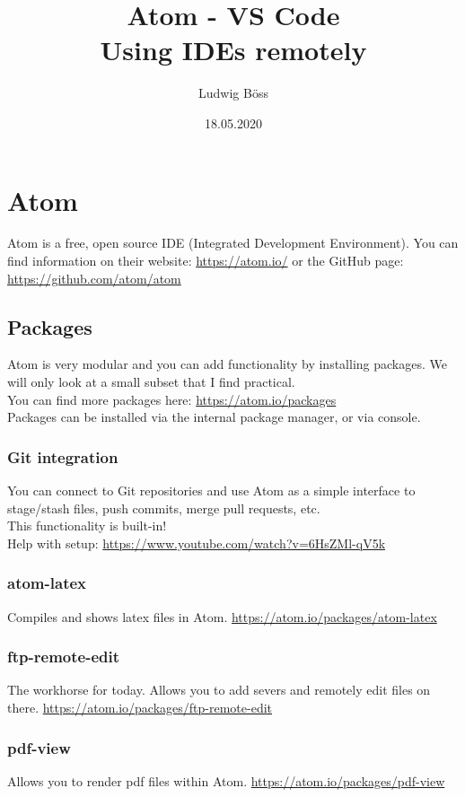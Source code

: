 \documentclass[10pt,a4paper]{article}
\title{Atom - VS Code\\Using IDEs remotely}
\date{18.05.2020}
\author{Ludwig Böss}
\begin{document}
\maketitle

\section{Atom}

Atom is a free, open source IDE (Integrated Development Environment). You can find information on their website: \url{https://atom.io/} or the GitHub page: \url{https://github.com/atom/atom}

\subsection{Packages}
Atom is very modular and you can add functionality by installing packages. We will only look at a small subset that I find practical.\\
You can find more packages here: \url{https://atom.io/packages}\\
Packages can be installed via the internal package manager, or via console.\\

\subsubsection{Git integration}
You can connect to Git repositories and use Atom as a simple interface to stage/stash files, push commits, merge pull requests, etc.\\
This functionality is built-in!\\
Help with setup: \url{https://www.youtube.com/watch?v=6HsZMl-qV5k}

\subsubsection{atom-latex}
Compiles and shows latex files in Atom. \url{https://atom.io/packages/atom-latex}

\subsubsection{ftp-remote-edit}
The workhorse for today. Allows you to add severs and remotely edit files on there.
\url{https://atom.io/packages/ftp-remote-edit}

\subsubsection{pdf-view}
Allows you to render pdf files within Atom. \url{https://atom.io/packages/pdf-view}
\end{document}
